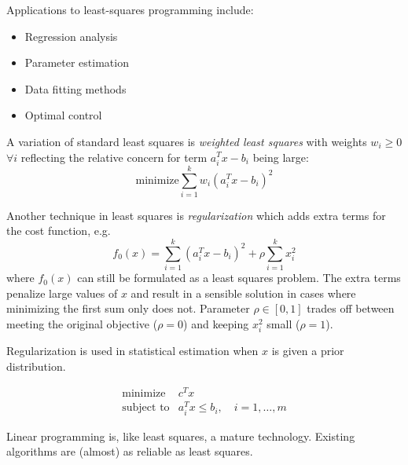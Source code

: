 Applications to least-squares programming include:

\begin{itemize}
\item Regression analysis
\item Parameter estimation
\item Data fitting methods
\item Optimal control
\end{itemize}

\begin{Fact}
  A variation of standard least squares is \textit{weighted least squares} with weights $w_i\ge 0$ $\forall i$ reflecting the relative concern for term $a_i^Tx-b_i$ being large:
  \begin{equation*}
    \text{minimize}\sum_{i=1}^kw_i(a_i^Tx-b_i)^2
  \end{equation*}
\end{Fact}

\begin{Fact}
  Another technique in least squares is \textit{regularization} which adds extra terms for the cost function, e.g.
  \begin{equation*}
    f_0(x) = \sum_{i=1}^k(a_i^Tx-b_i)^2+\rho\sum_{i=1}^k x_i^2
  \end{equation*}
  where $f_0(x)$ can still be formulated as a least squares problem. The extra terms penalize large values of $x$ and result in a sensible solution in cases where minimizing the first sum only does not. Parameter $\rho\in[0,1]$ trades off between meeting the original objective ($\rho=0$) and keeping $x_i^2$ small ($\rho=1$).

  \begin{Example}
    Regularization is used in statistical estimation when $x$ is given a prior distribution.
  \end{Example}
\end{Fact}


\begin{Definition}
  $$
  \begin{array}{rl}
    \text{minimize} & c^Tx \\
    \text{subject to} & a_i^Tx\le b_i,\quad i=1,\ldots,m
  \end{array}
  $$
\end{Definition}

Linear programming is, like least squares, a mature technology. Existing algorithms are (almost) as reliable as least squares.

